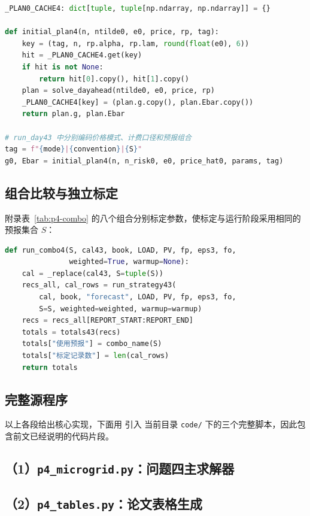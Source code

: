 \documentclass[withoutpreface,bwprint]{cumcmthesis}
\begin{document}
\begin{appendices}
\begin{lstlisting}[language=Python]
_PLAN0_CACHE4: dict[tuple, tuple[np.ndarray, np.ndarray]] = {}

def initial_plan4(n, ntilde0, e0, price, rp, tag):
    key = (tag, n, rp.alpha, rp.lam, round(float(e0), 6))
    hit = _PLAN0_CACHE4.get(key)
    if hit is not None:
        return hit[0].copy(), hit[1].copy()
    plan = solve_dayahead(ntilde0, e0, price, rp)
    _PLAN0_CACHE4[key] = (plan.g.copy(), plan.Ebar.copy())
    return plan.g, plan.Ebar

# run_day43 中分别编码价格模式、计费口径和预报组合
tag = f"{mode}|{convention}|{S}"
g0, Ebar = initial_plan4(n, n_risk0, e0, price_hat0, params, tag)
\end{lstlisting}

\subsection{组合比较与独立标定}

附录表~\ref{tab:p4-combo} 的八个组合分别标定参数，使标定与运行阶段采用相同的
预报集合 $S$：

\begin{lstlisting}[language=Python]
def run_combo4(S, cal43, book, LOAD, PV, fp, eps3, fo,
               weighted=True, warmup=None):
    cal = _replace(cal43, S=tuple(S))
    recs_all, cal_rows = run_strategy43(
        cal, book, "forecast", LOAD, PV, fp, eps3, fo,
        S=S, weighted=weighted, warmup=warmup)
    recs = recs_all[REPORT_START:REPORT_END]
    totals = totals43(recs)
    totals["使用预报"] = combo_name(S)
    totals["标定记录数"] = len(cal_rows)
    return totals
\end{lstlisting}

\newpage
\subsection{完整源程序}
\label{sec:p4-fullsrc}

以上各段给出核心实现，下面用 \lstinline|| 引入
当前目录 \texttt{code/} 下的三个完整脚本，因此包含前文已经说明的代码片段。

\subsection*{（1）\texttt{p4\_microgrid.py}：问题四主求解器}


\subsection*{（2）\texttt{p4\_tables.py}：论文表格生成}



\end{appendices}
\end{document}
